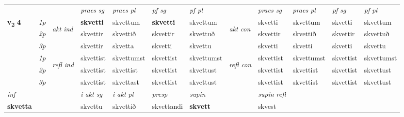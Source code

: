 \begin{longtable}[l]{X>{\footnotesize\itshape}llXXXXlXXXX}
\midrule

 & &   & \textit{praes sg}  & \textit{praes pl}    & \textit{ pf sg} & \textit{pf pl} & & \textit{praes sg}  & \textit{praes pl}    & \textit{pf sg} & \textit{pf pl }  \\ \cmidrule{4-7} \cmidrule{9-12}
 \multirow{2}{*}{{{\textbf{v{\textsubscript{2}}} \Large{\textbf{4}}}}}  & 1p & \multirow{3}{*}{\begin{turn}{90}\textit{akt ind}\end{turn}} & \textbf{skvetti} & skvettum & \textbf{skvetti} & skvettum & \multirow{3}{*}{\begin{turn}{90}\textit{akt con}\end{turn}} &skvetti & skvettum & skvetti & skvettum\\*
 & 2p &  &  skvettir  & skvettið & skvettir & skvettuð & & skvettir & skvettið & skvettir & skvettuð \\*
 & 3p &  & skvettir & skvetta & skvetti & skvettu & & skvetti & skvetti& skvetti & skvettu \\*
\cmidrule{4-7} \cmidrule{9-12}
 & 1p & \multirow{3}{*}{\begin{turn}{90}\textit{refl ind}\end{turn}}  & skvettist & skvettumst & skvettist & skvettumst & \multirow{3}{*}{\begin{turn}{90}\textit{refl con}\end{turn}}  &skvettist & skvettumst & skvettist & skvettumst \\*
 & 2p &  & skvettist & skvettist & skvettist & skvettust & &skvettist & skvettist & skvettist & skvettust \\*
 & 3p  & & skvettist & skvettast & skvettist & skvettust & & skvettist & skvettist& skvettist & skvettust \\*
\cmidrule{4-7} \cmidrule{9-12}

   {\textit{inf}} & &  & \textit{i akt sg} & \textit{i akt pl}   & \textit{presp} & \textit{supin} && \textit{supin refl}  \\*
  {\textbf{skvetta}} & && skvettu  & skvettið   & skvettandi &  \textbf{skvett} && skvest  \\*


\end{longtable}
